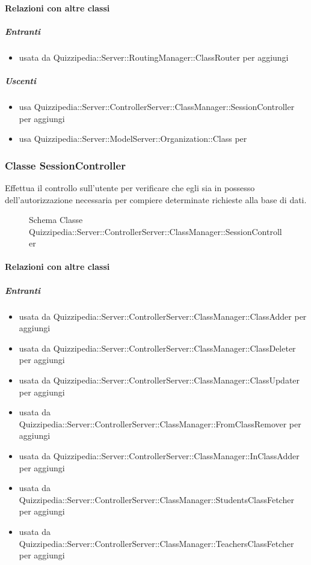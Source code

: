 \paragraph{Relazioni con altre classi}
\subparagraph{Entranti}
\begin{itemize}
\item usata da Quizzipedia::Server::RoutingManager::ClassRouter per aggiungi
\end{itemize}
\subparagraph{Uscenti}
\begin{itemize}
\item usa Quizzipedia::Server::ControllerServer::ClassManager::SessionController per aggiungi
\item usa Quizzipedia::Server::ModelServer::Organization::Class per 
\end{itemize}
\subsubsection{Classe SessionController}
Effettua il controllo sull'utente per verificare che egli sia in possesso dell'autorizzazione necessaria per compiere determinate richieste alla base di dati.
\begin{figure}[H]
\centering
\noindent{}
\caption[Schema Classe SessionController]{Schema Classe Quizzipedia::Server::ControllerServer::ClassManager::SessionController}
\end{figure}
\paragraph{Relazioni con altre classi}
\subparagraph{Entranti}
\begin{itemize}
\item usata da Quizzipedia::Server::ControllerServer::ClassManager::ClassAdder per aggiungi
\item usata da Quizzipedia::Server::ControllerServer::ClassManager::ClassDeleter per aggiungi
\item usata da Quizzipedia::Server::ControllerServer::ClassManager::ClassUpdater per aggiungi
\item usata da Quizzipedia::Server::ControllerServer::ClassManager::FromClassRemover per aggiungi
\item usata da Quizzipedia::Server::ControllerServer::ClassManager::InClassAdder per aggiungi
\item usata da Quizzipedia::Server::ControllerServer::ClassManager::StudentsClassFetcher per aggiungi
\item usata da Quizzipedia::Server::ControllerServer::ClassManager::TeachersClassFetcher per aggiungi
\end{itemize}
